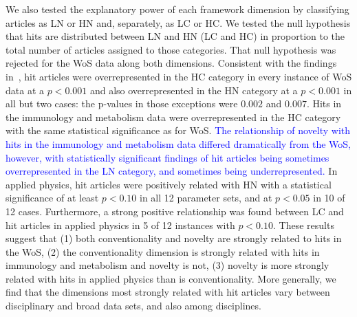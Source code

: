 \documentclass[NETN]{stjour}
\begin{document}
We also tested the explanatory power of each framework dimension by classifying articles as %
LN %
 or 
HN
 and, separately, as 
LC
or 
HC. 
We tested the null hypothesis that hits are distributed between LN and HN (LC and HC) in proportion to the total number of articles assigned to those categories.  That null hypothesis was rejected for the WoS data along both dimensions. Consistent with the findings in~\cite{uzzi_atypical_2013}, hit articles were overrepresented in the HC category in every instance of WoS data at a $p<0.001$ and also overrepresented in the HN category at a $p<0.001$ in all but two cases: the p-values in those exceptions were $0.002$ and $0.007$.  
Hits in the immunology and metabolism data were overrepresented in the HC category with the same statistical significance as for WoS. \textcolor{blue}{The relationship of novelty with hits in the immunology and metabolism data differed dramatically from the WoS, however, with statistically significant findings of hit articles being sometimes overrepresented in the LN category, and sometimes being underrepresented.}  In applied physics, hit articles were positively related with HN with a statistical significance of at least $p<0.10$ in all 12 parameter sets, and at $p<0.05$ in 10 of 12 cases.  Furthermore, a strong positive relationship was found between LC and hit articles in applied physics in 5 of 12 instances with $p<0.10$. These results suggest that (1) both conventionality and novelty are strongly related to hits in the WoS, (2) the conventionality dimension is strongly related with hits in immunology and metabolism and novelty is not, (3) novelty is more strongly related with hits in applied physics than is conventionality. More generally, we find that the dimensions most strongly related with hit articles vary between disciplinary and broad data sets, and also among disciplines. 

\end{document}
